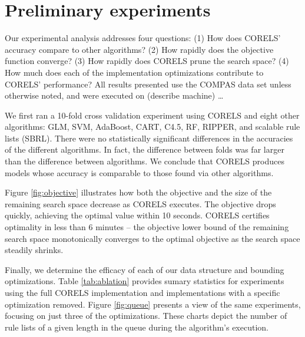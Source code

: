 \section{Preliminary experiments}
\label{sec:experiments}

Our experimental analysis addresses four questions:
(1) How does CORELS' accuracy compare to other algorithms?
(2) How rapidly does the objective function converge?
(3) How rapidly does CORELS prune the search space?
(4) How much does each of the implementation optimizations contribute to CORELS' performance?
All results presented use the COMPAS data set unless otherwise noted,
and were executed on (describe machine) \dots

We first ran a 10-fold cross validation experiment using CORELS and eight other algorithms:
GLM, SVM, AdaBoost, CART, C4.5, RF, RIPPER, and scalable rule lists (SBRL).
There were no statistically significant differences in the accuracies of the different
algorithms. In fact, the difference between folds was far larger than the difference
between algorithms. We conclude that CORELS produces models whose accuracy is comparable
to those found via other algorithms.

Figure \ref{fig:objective} illustrates how both the objective and the size of
the remaining search space decrease as CORELS executes.
The objective drops quickly, achieving the optimal value within 10 seconds.
CORELS certifies optimality in less than 6 minutes --
the objective lower bound of the remaining search space
monotonically converges to the optimal objective
as the search space steadily shrinks.

Finally, we determine the efficacy of each of our data structure and bounding
optimizations.
Table \ref{tab:ablation} provides sumary statistics for experiments using
the full CORELS implementation and implementations with a specific
optimization removed.
Figure \ref{fig:queue} presents a view of the same experiments, focusing
on just three of the optimizations. These charts depict the number of rule
lists of a given length in the queue during the algorithm's execution.

